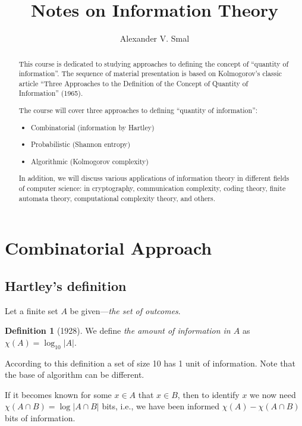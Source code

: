 \documentclass[12pt,sans]{article}
\title{Notes on Information Theory}
\author{Alexander V. Smal}
\theoremstyle{definition}
\newtheorem{definition}{Definition}[section]
\theoremstyle{plain}
\theoremstyle{remark}
\begin{document}
\maketitle

\begin{abstract}
    This course is dedicated to studying approaches to defining the concept of ``quantity of information''. The sequence of material presentation is based on Kolmogorov's classic article ``Three Approaches to the Definition of the Concept of Quantity of Information'' (1965).

    The course will cover three approaches to defining ``quantity of information'':
    \begin{itemize}
        \item Combinatorial (information by Hartley)
        \item Probabilistic (Shannon entropy)
        \item Algorithmic (Kolmogorov complexity)
    \end{itemize}

    In addition, we will discuss various applications of information theory in different fields of computer science: in cryptography, communication complexity, coding theory, finite automata theory, computational complexity theory, and others.
\end{abstract}

\newpage\tableofcontents\newpage

\section{Combinatorial Approach}
\subsection{Hartley's definition}
Let a finite set \(A\) be given—\emph{the set of outcomes}.
\begin{definition}[1928]
    We define \emph{the amount of information in \(A\)} as \(\chi(A) = \log_{10}|A|\).
\end{definition}

According to this definition a set of size 10 has 1 unit of information.
Note that the base of algorithm can be different.

If it becomes known for some \(x\in A\) that \(x\in B\), then to identify \(x\) we now need \(\chi(A\cap B) = \log |A\cap B|\) bits, i.e., we have been informed \(\chi(A) - \chi(A\cap B)\) bits of information.
\end{document}
